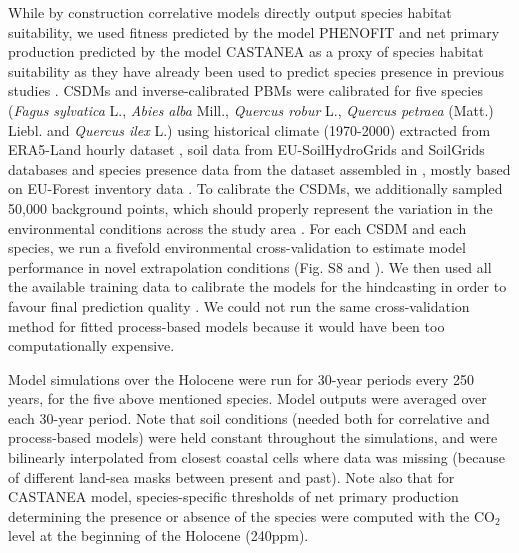 \documentclass[9pt,twocolumn,twoside]{pnas-new}
\newcommand{\textappr}{\raisebox{0.5ex}{\texttildelow}}
\begin{document}
{While by construction correlative models directly output species habitat suitability, we used fitness predicted by the model PHENOFIT and net primary production predicted by the model CASTANEA as a proxy of species habitat suitability as they have already been used to predict species presence in previous studies \cite{Morin2009, Cheaib2012, Saltre2013}. 
CSDMs and inverse-calibrated PBMs were calibrated for five species (\textit{Fagus sylvatica} L., \textit{Abies alba} Mill., \textit{Quercus robur} L., \textit{Quercus petraea}  (Matt.) Liebl. and \textit{Quercus ilex} L.) using historical climate (1970-2000) extracted from ERA5-Land hourly dataset \cite{MunozSabater2021}, soil data from EU-SoilHydroGrids \cite{Toth2017} and SoilGrids \cite{Hengl2017} databases and species presence data from the dataset assembled in \cite{VanderMeersch2023}, mostly based on EU-Forest inventory data \cite{Mauri2017}. To calibrate the CSDMs, we additionally sampled 50,000 background points, which should properly represent the variation in the environmental conditions across the study area \cite{Valavi2022}. For each CSDM and each species, we run a fivefold environmental cross-validation to estimate model performance in novel extrapolation conditions (Fig. S8 and \cite{Roberts2017}). We then used all the available training data to calibrate the models for the hindcasting in order to favour final prediction quality \cite{Roberts2017}. We could not run the same cross-validation method for fitted process-based models because it would have been too computationally expensive. 

Model simulations over the Holocene were run for 30-year periods every 250 years, for the five above mentioned species. Model outputs were averaged over each 30-year period. Note that soil conditions (needed both for correlative and process-based models) were held constant throughout the simulations, and were bilinearly interpolated from closest coastal cells where data was missing (because of different land-sea masks between present and past). Note also that for CASTANEA model, species-specific thresholds of net primary production determining the presence or absence of the species were computed with the CO$_2$ level at the beginning of the Holocene (\textappr240ppm).

}
\end{document}
